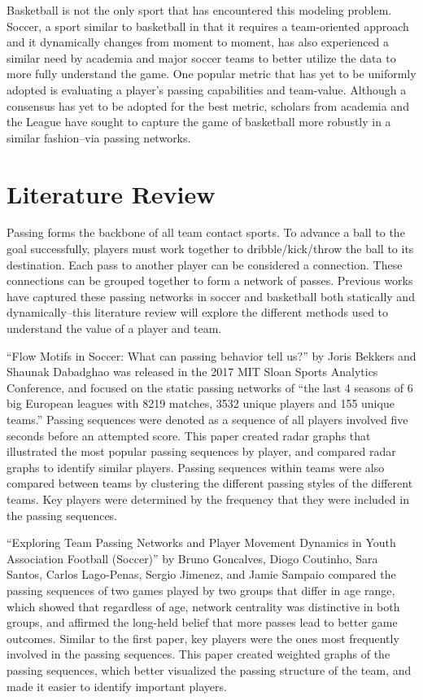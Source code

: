 \documentclass[12pt,twoside]{dukestatscithesis}
\theoremstyle{definition}
\theoremstyle{definition}
\theoremstyle{definition}
\theoremstyle{remark}
\begin{document}
Basketball is not the only sport that has encountered this modeling
problem. Soccer, a sport similar to basketball in that it requires a
team-oriented approach and it dynamically changes from moment to moment,
has also experienced a similar need by academia and major soccer teams
to better utilize the data to more fully understand the game. One
popular metric that has yet to be uniformly adopted is evaluating a
player's passing capabilities and team-value. Although a consensus has
yet to be adopted for the best metric, scholars from academia and the
League have sought to capture the game of basketball more robustly in a
similar fashion--via passing networks.

\chapter{Literature Review}\label{rmd-basics}

Passing forms the backbone of all team contact sports. To advance a ball
to the goal successfully, players must work together to
dribble/kick/throw the ball to its destination. Each pass to another
player can be considered a connection. These connections can be grouped
together to form a network of passes. Previous works have captured these
passing networks in soccer and basketball both statically and
dynamically--this literature review will explore the different methods
used to understand the value of a player and team.

``Flow Motifs in Soccer: What can passing behavior tell us?'' by Joris
Bekkers and Shaunak Dabadghao was released in the 2017 MIT Sloan Sports
Analytics Conference, and focused on the static passing networks of
``the last 4 seasons of 6 big European leagues with 8219 matches, 3532
unique players and 155 unique teams.'' Passing sequences were denoted as
a sequence of all players involved five seconds before an attempted
score. This paper created radar graphs that illustrated the most popular
passing sequences by player, and compared radar graphs to identify
similar players. Passing sequences within teams were also compared
between teams by clustering the different passing styles of the
different teams. Key players were determined by the frequency that they
were included in the passing sequences.

``Exploring Team Passing Networks and Player Movement Dynamics in Youth
Association Football (Soccer)'' by Bruno Goncalves, Diogo Coutinho, Sara
Santos, Carlos Lago-Penas, Sergio Jimenez, and Jamie Sampaio compared
the passing sequences of two games played by two groups that differ in
age range, which showed that regardless of age, network centrality was
distinctive in both groups, and affirmed the long-held belief that more
passes lead to better game outcomes. Similar to the first paper, key
players were the ones most frequently involved in the passing sequences.
This paper created weighted graphs of the passing sequences, which
better visualized the passing structure of the team, and made it easier
to identify important players.
\end{document}
